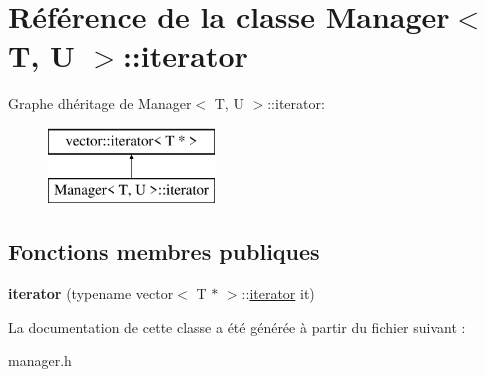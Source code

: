 \hypertarget{class_manager_1_1iterator}{}\section{Référence de la classe Manager$<$ T, U $>$\+:\+:iterator}
\label{class_manager_1_1iterator}
Graphe d\textquotesingle{}héritage de Manager$<$ T, U $>$\+:\+:iterator\+:\begin{figure}[H]
\begin{center}
\leavevmode
\includegraphics[height=2.000000cm]{class_manager_1_1iterator}
\end{center}
\end{figure}
\subsection*{Fonctions membres publiques}
\begin{DoxyCompactItemize}
\item 
\hypertarget{class_manager_1_1iterator_a9d451fc2bd2298ecddeabd4cc817e8ec}{}{\bfseries iterator} (typename vector$<$ T $\ast$ $>$\+::\hyperlink{class_manager_1_1iterator}{iterator} it)\label{class_manager_1_1iterator_a9d451fc2bd2298ecddeabd4cc817e8ec}

\end{DoxyCompactItemize}


La documentation de cette classe a été générée à partir du fichier suivant \+:\begin{DoxyCompactItemize}
\item 
manager.\+h\end{DoxyCompactItemize}
